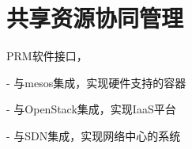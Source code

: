 

\chapter{共享资源协同管理}
\label{chap:parddc}

PRM软件接口，

- 与mesos集成，实现硬件支持的容器

- 与OpenStack集成，实现IaaS平台

- 与SDN集成，实现网络中心的系统

